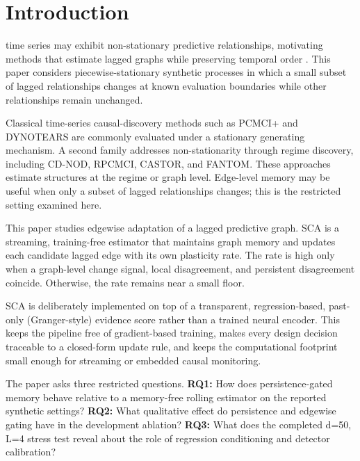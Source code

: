 \documentclass{ieeeaccess}
\begin{document}
\titlepgskip=-21pt

\maketitle

\section{Introduction}
\label{sec:introduction}
 time series may exhibit non-stationary predictive relationships, motivating methods that estimate lagged graphs while preserving temporal order \cite{r1,r5}. This paper considers piecewise-stationary synthetic processes in which a small subset of lagged relationships changes at known evaluation boundaries while other relationships remain unchanged.

Classical time-series causal-discovery methods such as PCMCI+ and DYNOTEARS are commonly evaluated under a stationary generating mechanism. A second family addresses non-stationarity through regime discovery, including CD-NOD, RPCMCI, CASTOR, and FANTOM. These approaches estimate structures at the regime or graph level. Edge-level memory may be useful when only a subset of lagged relationships changes; this is the restricted setting examined here.

This paper studies edgewise adaptation of a lagged predictive graph. SCA is a streaming, training-free estimator that maintains graph memory and updates each candidate lagged edge with its own plasticity rate. The rate is high only when a graph-level change signal, local disagreement, and persistent disagreement coincide. Otherwise, the rate remains near a small floor.

SCA is deliberately implemented on top of a transparent, regression-based, past-only (Granger-style) evidence score rather than a trained neural encoder. This keeps the pipeline free of gradient-based training, makes every design decision traceable to a closed-form update rule, and keeps the computational footprint small enough for streaming or embedded causal monitoring.

The paper asks three restricted questions. \textbf{RQ1:} How does persistence-gated memory behave relative to a memory-free rolling estimator on the reported synthetic settings? \textbf{RQ2:} What qualitative effect do persistence and edgewise gating have in the development ablation? \textbf{RQ3:} What does the completed d=50, L=4 stress test reveal about the role of regression conditioning and detector calibration?
\end{document}
